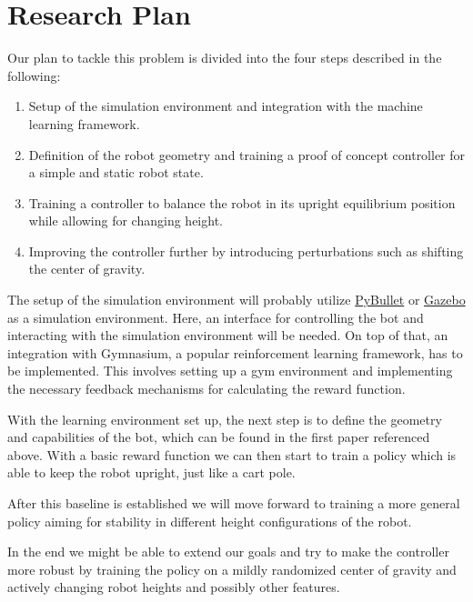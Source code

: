 \documentclass[10pt, a4paper]{article}
\begin{document}
\section{Research Plan}
Our plan to tackle this problem is divided into the four steps described in the following:
\begin{enumerate}
  \item Setup of the simulation environment and integration with the machine learning framework.
  \item Definition of the robot geometry and training a proof of concept controller for a simple and static robot state.
  \item Training a controller to balance the robot in its upright equilibrium position while allowing for changing height.
  \item Improving the controller further by introducing perturbations such as shifting the center of gravity.
\end{enumerate}

The setup of the simulation environment will probably utilize \hyperref{https://pybullet.org/wordpress/}{}{}{PyBullet} or \hyperref{https://gazebosim.org/home}{}{}{Gazebo} as a simulation
environment. Here, an interface for controlling the bot and interacting with the simulation environment
will be needed. On top of that, an integration with Gymnasium, a popular reinforcement learning
framework, has to be implemented. This involves setting up a gym environment and implementing the necessary
feedback mechanisms for calculating the reward function.

With the learning environment set up, the next step is to define the geometry and capabilities of the
bot, which can be found in the first paper referenced above. With a basic reward function we can then start
to train a policy which is able to keep the robot upright, just like a cart pole.

After this baseline is established we will move forward to training a more general policy aiming for
stability in different height configurations of the robot.

In the end we might be able to extend our goals and try to make the controller more robust by training
the policy on a mildly randomized center of gravity and actively changing robot heights and possibly
other features.
\end{document}
